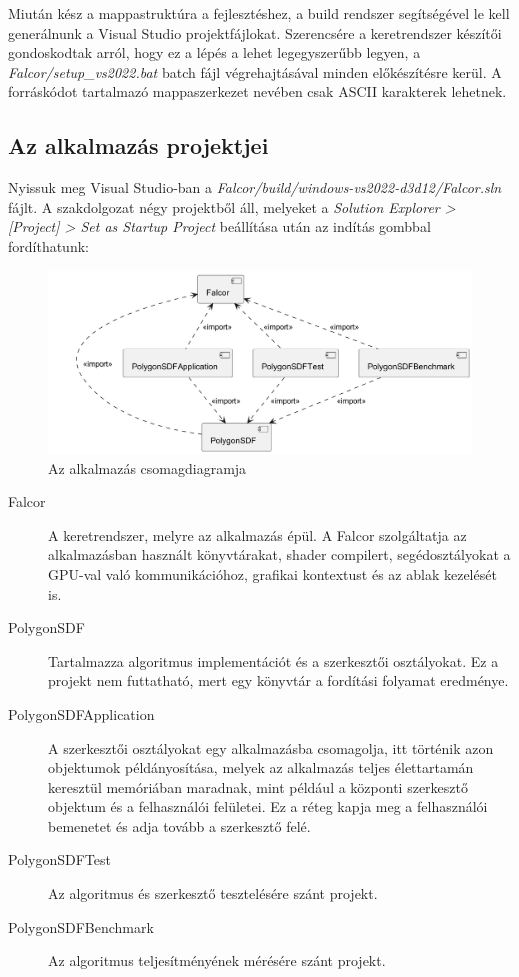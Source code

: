 Miután kész a mappastruktúra a fejlesztéshez, a build rendszer segítségével le kell generálnunk a Visual Studio projektfájlokat. Szerencsére a keretrendszer készítői gondoskodtak arról, hogy ez a lépés a lehet legegyszerűbb legyen, a \textit{Falcor/setup\_vs2022.bat} batch fájl végrehajtásával minden előkészítésre kerül. A forráskódot tartalmazó mappaszerkezet nevében csak ASCII karakterek lehetnek.


\subsection{Az alkalmazás projektjei}

Nyissuk meg Visual Studio-ban a \textit{Falcor/build/windows-vs2022-d3d12/Falcor.sln} fájlt. A szakdolgozat négy projektből áll, melyeket a \textit{Solution Explorer > [Project] > Set as Startup Project} beállítása után az indítás gombbal fordíthatunk:

\begin{figure}[H]
	\centering
	\includegraphics[width=1\linewidth]{images/component_project.png}
	\caption{Az alkalmazás csomagdiagramja}
	\label{fig:component_project-1}
\end{figure}

\begin{description}
    \item[Falcor] A keretrendszer, melyre az alkalmazás épül. A Falcor szolgáltatja az alkalmazásban használt könyvtárakat, shader compilert, segédosztályokat a GPU-val való kommunikációhoz, grafikai kontextust és az ablak kezelését is.
    \item[PolygonSDF] Tartalmazza algoritmus implementációt és a szerkesztői osztályokat. Ez a projekt nem futtatható, mert egy könyvtár a fordítási folyamat eredménye.
	\item[PolygonSDFApplication] A szerkesztői osztályokat egy alkalmazásba csomagolja, itt történik azon objektumok példányosítása, melyek az alkalmazás teljes élettartamán keresztül memóriában maradnak, mint például a központi szerkesztő objektum és a felhasználói felületei. Ez a réteg  kapja meg a felhasználói bemenetet és adja tovább a szerkesztő felé.
	\item[PolygonSDFTest] Az algoritmus és szerkesztő tesztelésére szánt projekt.
	\item[PolygonSDFBenchmark] Az algoritmus teljesítményének mérésére szánt projekt.
\end{description}



